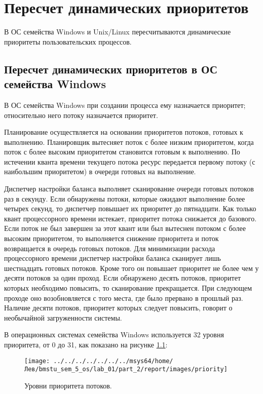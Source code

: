\chapter{Пересчет динамических приоритетов}
В ОС семейства Windows и Unix/Linux пересчитываются динамические приоритеты пользовательских процессов.

\section{Пересчет динамических приоритетов в ОС семейства Windows}
В ОС семейства Windows при создании процесса ему назначается приоритет; относительно него потоку назначается приоритет.

Планирование осуществляется на основании приоритетов потоков, готовых к выполнению. Планировщик вытесняет поток с более низким приоритетом, когда поток с более высоким приоритетом становится готовым к выполнению. По истечении кванта времени текущего потока ресурс передается первому потоку (с наибольшим приоритетом) в очереди готовых на выполнение.

Диспетчер настройки баланса выполняет сканирование очереди готовых потоков раз в секунду. Если обнаружены потоки, которые ожидают выполнение более четырех секунд, то диспетчер повышает их приоритет до пятнадцати. Как только квант процессорного времени истекает, приоритет потока снижается до базового. Если поток не был завершен за этот квант или был вытеснен потоком с более высоким приоритетом, то выполняется снижение приоритета и поток возвращается в очередь готовых потоков. Для минимизации расхода процессорного времени диспетчер настройки баланса сканирует лишь шестнадцать готовых потоков. Кроме того он повышает приоритет не более чем у десяти потоков за один проход. Если обнаружено десять потоков, приоритет которых необходимо повысить, то сканирование прекращается. При следующем проходе оно возобновляется с того места, где было прервано в прошлый раз. Наличие десяти потоков, приоритет которых следует повысить, говорит о необычайной загруженности системы.

В операционных системах семейства Windows используется 32 уровня приоритета, от 0 до 31, как показано на рисунке \ref{png:priority}:

\begin{figure}[H]
	\centering
	{
		\texttt{[image: ../../../../../../../msys64/home/Лев/bmstu\_sem\_5\_os/lab\_01/part\_2/report/images/priority]}
		\caption{Уровни приоритета потоков.}
		\label{png:priority}
	}
\end{figure}

